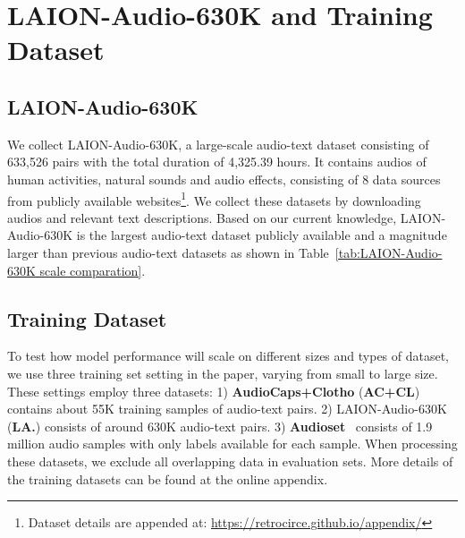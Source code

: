 \section{LAION-Audio-630K and Training Dataset}
\begin{table}[t]
\centering
{}
\caption{LAION-Audio-630K compared with existing datasets.}
\vspace{-0.8cm}
\label{tab:LAION-Audio-630K scale comparation}
\end{table}
\subsection{LAION-Audio-630K}\label{sec:dataset}

We collect LAION-Audio-630K, a large-scale audio-text dataset consisting of 633,526 pairs with the total duration of 4,325.39 hours. 
It contains audios of human activities, natural sounds and audio effects, consisting of 8 data sources from publicly available websites\footnote{Dataset details are appended at: \href{https://retrocirce.github.io/appendix/}{https://retrocirce.github.io/appendix/}}. 
We collect these datasets by downloading audios and relevant text descriptions. Based on our current knowledge, LAION-Audio-630K is the largest audio-text dataset publicly available and a magnitude larger than previous audio-text datasets as shown in Table~\ref{tab:LAION-Audio-630K scale comparation}.

\vspace{-0.3cm}
\subsection{Training Dataset} \label{sec:train_dataset}
To test how model performance will scale on different sizes and types of dataset, we use three training set setting in the paper, varying from small to large size. These settings employ three datasets: 1) \textbf{AudioCaps+Clotho} (\textbf{AC+CL})~\cite{audiocaps,clotho} contains about 55K training samples of audio-text pairs. 2) LAION-Audio-630K (\textbf{LA.}) consists of around 630K audio-text pairs. 
3) \textbf{Audioset}~\cite{audioset} consists of 1.9 million audio samples with only labels available for each sample. When processing these datasets, we exclude all overlapping data in evaluation sets. More details of the training datasets can be found at the online appendix.

